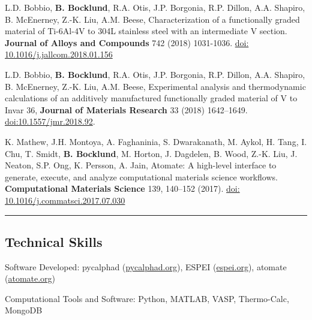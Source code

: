 \documentclass[10pt,letterpaper]{article}
\newenvironment{indentsection}[1]%
{\begin{list}{}%
  {\setlength{\leftmargin}{#1}}%
  \item[]%
}
{\end{list}}
\begin{document}
\begin{itemize*}
\item L.D. Bobbio, \textbf{B. Bocklund}, R.A. Otis, J.P. Borgonia, R.P. Dillon, A.A. Shapiro, B. McEnerney, Z.-K. Liu, A.M. Beese,
  Characterization of a functionally graded material of Ti-6Al-4V to 304L stainless steel with an intermediate V section. \textbf{Journal of Alloys and Compounds} 742 (2018) 1031-1036.
  \href{https://doi.org/10.1016/j.jallcom.2018.01.156}{doi: 10.1016/j.jallcom.2018.01.156}

\item L.D. Bobbio, \textbf{B. Bocklund}, R.A. Otis, J.P. Borgonia, R.P. Dillon, A.A. Shapiro, B. McEnerney, Z.-K. Liu, A.M. Beese,
  Experimental analysis and thermodynamic calculations of an additively manufactured functionally graded material of V to Invar 36,
  \textbf{Journal of Materials Research} 33 (2018) 1642–1649.
  \href{https://doi.org/10.1016/10.1557/jmr.2018.92}{doi:10.1557/jmr.2018.92}.

\item K. Mathew, J.H. Montoya, A. Faghaninia, S. Dwarakanath, M. Aykol,
  H. Tang, I. Chu, T. Smidt, \textbf{B. Bocklund}, M. Horton, J. Dagdelen, B. Wood, Z.-K. Liu, J. Neaton, S.P. Ong, K. Persson, A. Jain,
 Atomate: A high-level interface to generate, execute,
  and analyze computational materials science workflows. \textbf{Computational Materials Science} 139, 140–152 (2017).
  \href{https://doi.org/10.1016/j.commatsci.2017.07.030}{doi: 10.1016/j.commatsci.2017.07.030}

\end{itemize*}

\hrule
\vspace{-0.6em}
\subsection*{Technical Skills}

\begin{indentsection}{\parindent}
\begin{description*}
  \item [Software Developed:]
  pycalphad (\href{https://pycalphad.org}{pycalphad.org}),
  ESPEI (\href{https://espei.org}{espei.org}),
  atomate (\href{https://atomate.org}{atomate.org})
  \item[Computational Tools and Software:]
  Python, MATLAB, VASP, Thermo-Calc, MongoDB
\end{description*}
\end{indentsection}
\end{document}
